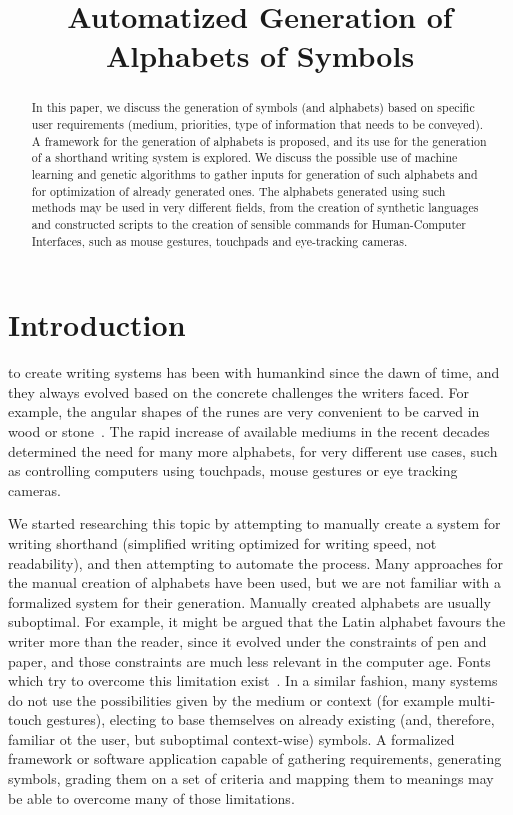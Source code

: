 \documentclass[conference]{IEEEtran}
\title{Automatized Generation of Alphabets of Symbols}
\author{
\IEEEauthorblockN{Serhii Hamotskyi}
\IEEEauthorblockA{
    Faculty of Informatics and Computer Technology \\
    Department of Computer Systems \\
    Igor Sykorsky Kyiv Polytechnic Institute \\
37, Prosp. Peremohy, Kyiv, Ukraine, 03056 \\
Email: shamotskyi@gmail.com}
}
\begin{document}
\maketitle              %

\begin{abstract}
In this paper, we discuss the generation of symbols (and alphabets) based on specific user requirements (medium, priorities, type of information that needs to be conveyed). A framework for the generation of alphabets is proposed, and its use for the generation of a shorthand writing system is explored. We discuss the possible use of machine learning and genetic algorithms to gather inputs for generation of such alphabets and for optimization of already generated ones. The alphabets generated using such methods may be used in very different fields, from the creation of synthetic languages and constructed scripts to the creation of sensible commands for Human-Computer Interfaces, such as mouse gestures, touchpads and eye-tracking cameras.
\end{abstract}

\section{Introduction}
%
\IEEEoverridecommandlockouts{} to create writing systems has been with humankind since the dawn of time, and they always evolved based on the concrete challenges the writers faced. For example, the angular shapes of the runes are very convenient to be carved in wood or stone~\citep{williams1996origin}. The rapid increase of available mediums in the recent decades determined the need for many more alphabets, for very different use cases, such as controlling computers using touchpads, mouse gestures or eye tracking cameras.

We started researching this topic by attempting to manually create a system for writing shorthand (simplified writing optimized for writing speed, not readability), and then attempting to automate the process.	 Many approaches for the manual creation of alphabets have been used, but we are not familiar with a formalized system for their generation. Manually created alphabets are usually suboptimal. For example, it might be argued that the Latin alphabet favours the writer more than the
reader, since it evolved under the constraints of pen and paper, and those constraints are much less relevant in the computer age. Fonts which try to overcome this limitation exist~\citep{dotsies}. In a similar fashion, many systems do not use the possibilities given by the medium or context (for example multi-touch gestures), electing to base themselves on already existing (and, therefore, familiar ot the user, but suboptimal context-wise) symbols. A formalized framework or software application capable of gathering requirements, generating symbols, grading them on a set of criteria and mapping them to meanings may be able to overcome many of those limitations.
\end{document}
